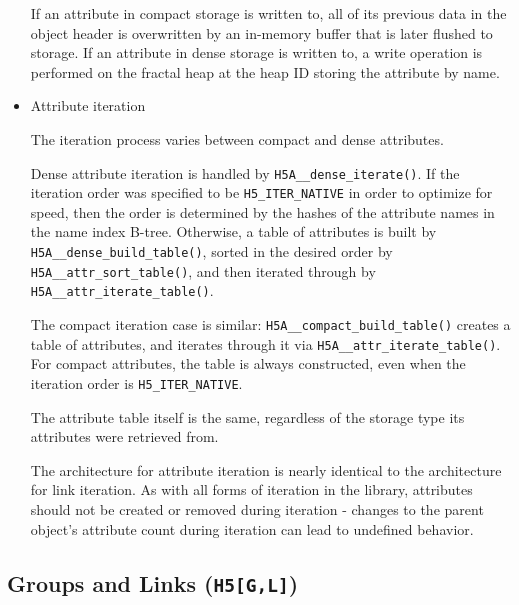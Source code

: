 \begin{itemize}
If an attribute in compact storage is written to, all of its previous data in the object header is overwritten by an in-memory buffer that is later flushed to storage. If an attribute in dense storage is written to, a write operation is performed on the fractal heap at the heap ID storing the attribute by name. 

    \item Attribute iteration

The iteration process varies between compact and dense attributes.

Dense attribute iteration is handled by \texttt{H5A\_\_dense\_iterate()}. If the iteration order was specified to be \texttt{H5\_ITER\_NATIVE} in order to optimize for speed, then the order is determined by the hashes of the attribute names in the name index B-tree. Otherwise, a table of attributes is built by \texttt{H5A\_\_dense\_build\_table()}, sorted in the desired order by \texttt{H5A\_\_attr\_sort\_table()}, and then iterated through by \texttt{H5A\_\_attr\_iterate\_table()}.

The compact iteration case is similar: \texttt{H5A\_\_compact\_build\_table()} creates a table of attributes, and iterates through it via \texttt{H5A\_\_attr\_iterate\_table()}. For compact attributes, the table is always constructed, even when the iteration order is \texttt{H5\_ITER\_NATIVE}. 

The attribute table itself is the same, regardless of the storage type its attributes were retrieved from.

The architecture for attribute iteration is nearly identical to the architecture for link iteration. As with all forms of iteration in the library, attributes should not be created or removed during iteration - changes to the parent object's attribute count during iteration can lead to undefined behavior.

\end{itemize}

\subsection{Groups and Links (\texttt{H5[G,L]})}


